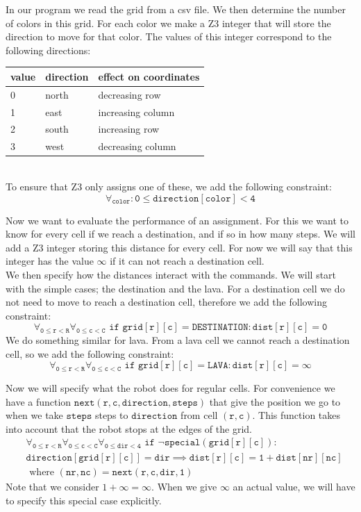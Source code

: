 \documentclass{scrartcl}
\begin{document}
	In our program we read the grid from a csv file.
	We then determine the number of colors in this grid.
	For each color we make a Z3 integer that will store the direction to move for that color. The values of this integer correspond to the following directions:\\

	\begin{tabular}{l|ll}
		value & direction & effect on coordinates\\
		\hline
		0 & north & decreasing row\\
		1 & east & increasing column\\
		2 & south & increasing row\\
		3 & west & decreasing column\\
	\end{tabular}\\

	To ensure that Z3 only assigns one of these, we add the following constraint:
	$$\mathtt{\forall_{color}: 0 \le direction[color] < 4}$$

	Now we want to evaluate the performance of an assignment. For this we want to know for every cell if we reach a destination, and if so in how many steps. We will add a Z3 integer storing this distance for every cell. For now we will say that this integer has the value $\infty$ if it can not reach a destination cell.\\

	We then specify how the distances interact with the commands. We will start with the simple cases; the destination and the lava. For a destination cell we do not need to move to reach a destination cell, therefore we add the following constraint:
	$$\mathtt{\forall_{0\le r<R}\forall_{0\le c<C}\text{ if }grid[r][c]=DESTINATION: dist[r][c]=0}$$
	We do something similar for lava. From a lava cell we cannot reach a destination cell, so we add the following constraint:
	$$\mathtt{\forall_{0\le r<R}\forall_{0\le c<C}\text{ if }grid[r][c]=LAVA: dist[r][c]=\infty}$$

	Now we will specify what the robot does for regular cells. For convenience we have a function $\mathtt{next(r,c,direction,steps)}$ that give the position we go to when we take $\mathtt{steps}$ steps to $\mathtt{direction}$ from cell $(\mathtt{r},\mathtt{c})$. This function takes into account that the robot stops at the edges of the grid.
	\begin{align*}
		&\mathtt{\forall_{0\le r<R}\forall_{0\le c<C}\forall_{0\le dir<4}\text{ if }\neg special(grid[r][c]):}\\
		&\mathtt{direction[grid[r][c]]=dir \implies dist[r][c]=1+dist[nr][nc]}\\
		&\text{ where }
		\mathtt{(nr,nc) = next(r,c,dir,1)}
	\end{align*}
	Note that we consider $1+\infty=\infty$. When we give $\infty$ an actual value, we will have to specify this special case explicitly.
\end{document}
